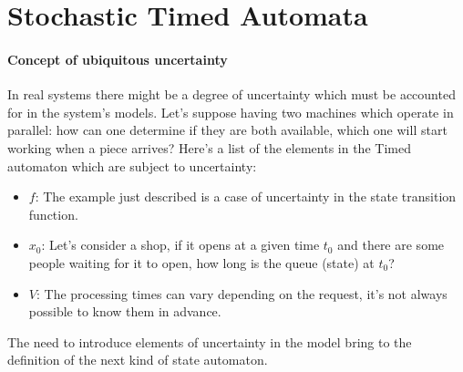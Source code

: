 \documentclass[12pt,a4paper]{article}
\begin{document}
\section{Stochastic Timed Automata}
\label{sec:STA}
\paragraph{Concept of ubiquitous uncertainty}
In real systems there might be a degree of uncertainty which must be accounted for in the system's models. Let's suppose having two machines which operate in parallel: how can one determine if they are both available, which one will start working when a piece arrives? Here’s a list of the elements in the Timed automaton which are subject to uncertainty:
\begin{itemize}
\item $f$: The example just described is a case of uncertainty in the state transition function.
\item $x_0$: Let’s consider a shop, if it opens at a given time $t_0$ and there are some people waiting for it to open, how long is the queue (state) at $t_0$? 
\item $V$: The processing times can vary depending on the request, it’s not always possible to know them in advance.
\end{itemize}
The need to introduce elements of uncertainty in the model bring to the definition of the next kind of state automaton.
\end{document}
